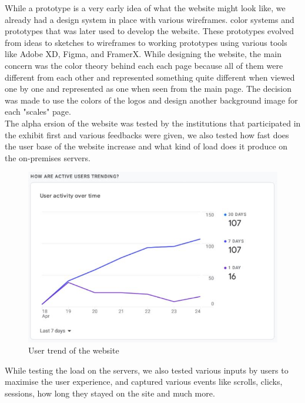 While a prototype is a very early idea of what the website might look like, we already had a design system in place with various wireframes. color systems and prototypes that was later used to develop the website. These prototypes evolved from ideas to sketches to wireframes to working prototypes using various tools like Adobe XD, Figma, and FramerX. While designing the website, the main concern was the color theory behind each each page because all of them were different from each other and represented something quite different when viewed one by one and represented as one when seen from the main page. The decision was made to use the colors of the logos and design another background image for each "scales" page. 
\\
The alpha ersion of the website was tested by the institutions that participated in the exhibit first and various feedbacks were given, we also tested how fast does the user base of the website increase and what kind of load does it produce on the on-premises servers.   

\begin{figure}[h]
	\begin{center}
		\includegraphics[scale=0.5]{Figures/user-trend.JPG}
		\caption{User trend of the website}
		\label{fig:rb}
	\end{center}
\end{figure}

While testing the load on the servers, we also tested various inputs by users to maximise the user experience, and captured various events like scrolls, clicks, sessions, how long they stayed on the site and much more.

